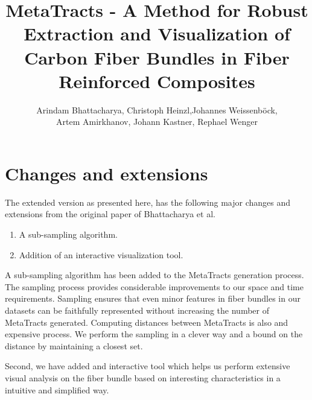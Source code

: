 \documentclass[]{article}
\title{MetaTracts - A Method for Robust Extraction and Visualization of Carbon Fiber Bundles in Fiber Reinforced Composites}
\author{Arindam Bhattacharya, Christoph Heinzl,Johannes Weissenb{\"o}ck,\\Artem Amirkhanov,
	Johann Kastner, Rephael Wenger}
\begin{document}
\maketitle

\section{Changes and extensions}
The extended version as presented here, has the following major changes and extensions from the original paper of Bhattacharya et al.~\cite{Bhattacharya2015} 
\begin{enumerate}
	\item A sub-sampling algorithm.
	\item Addition of an interactive visualization tool.
\end{enumerate}

A sub-sampling algorithm has been added to the MetaTracts generation process. The sampling process provides considerable improvements to our space and time requirements. Sampling ensures that even minor features in fiber bundles in our datasets can be faithfully represented without increasing the number of MetaTracts generated.
Computing distances between MetaTracts is also and expensive process. We perform the sampling in a clever way and a bound on the distance by maintaining a closest set.

 
Second, we have added and interactive tool which helps us perform extensive  visual analysis on the fiber bundle based on interesting characteristics in a intuitive and simplified way.  




\end{document}
